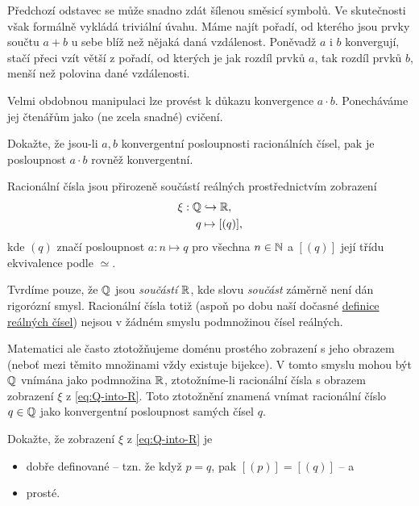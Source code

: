 Předchozí odstavec se může snadno zdát šílenou směsicí symbolů. Ve skutečnosti
však formálně vykládá triviální úvahu. Máme najít pořadí, od kterého jsou prvky
součtu $a + b$ u sebe blíž než nějaká daná vzdálenost. Poněvadž $a$ i $b$
konvergují, stačí přeci vzít větší z pořadí, od kterých je jak rozdíl prvků $a$,
tak rozdíl prvků $b$, menší než polovina dané vzdálenosti.

Velmi obdobnou manipulaci lze provést k důkazu konvergence $a \cdot b$.
Ponecháváme jej čtenářům jako (ne zcela snadné) cvičení.

\begin{exercise}{}{}
 Dokažte, že jsou-li $a,b$ konvergentní posloupnosti racionálních čísel, pak je
 posloupnost $a \cdot b$ rovněž konvergentní.
\end{exercise}

Racionální čísla jsou přirozeně součástí reálných prostřednictvím zobrazení
\begin{equation}
 \label{eq:Q-into-R}
 \begin{split}
  \xi: \mathbb{Q} &\hookrightarrow \mathbb{R},\\
  q &\mapsto [(q)],
 \end{split}
\end{equation}
kde $(q)$ značí posloupnost $a: n \mapsto q$ pro všechna $n \in \mathbb{N}$ a $[(q)]$
její třídu ekvivalence podle $ \simeq $.

\begin{warning}{}{}
 Tvrdíme pouze, že $\mathbb{Q}$ jsou \emph{součástí} $\mathbb{R}$, kde slovu \emph{součást}
 záměrně není dán rigorózní smysl. Racionální čísla totiž (aspoň po dobu naší
 dočasné \hyperref[def:realna-cisla]{definice reálných čísel}) nejsou v žádném
 smyslu podmnožinou čísel reálných.

 Matematici ale často ztotožňujeme doménu prostého zobrazení s jeho obrazem
 (neboť mezi těmito množinami vždy existuje bijekce). V tomto smyslu mohou být
 $\mathbb{Q}$ vnímána jako podmnožina $\mathbb{R}$, ztotožníme-li racionální čísla s obrazem
 zobrazení $\xi$ z \eqref{eq:Q-into-R}. Toto ztotožnění znamená vnímat
 racionální číslo $q \in \mathbb{Q}$ jako konvergentní posloupnost samých čísel $q$.
\end{warning}

\begin{exercise}{}{}
 Dokažte, že zobrazení $\xi$ z \eqref{eq:Q-into-R} je
 \begin{itemize}
  \item dobře definované -- tzn. že když $p = q$, pak $[(p)] = [(q)]$ -- a
  \item prosté.
 \end{itemize}
\end{exercise}

